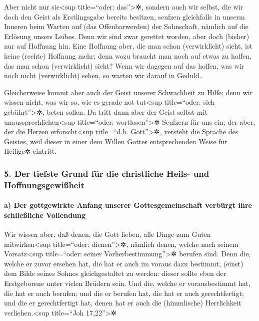  Aber nicht nur sie\textless sup title=``oder:
das''\textgreater✲, sondern auch wir selbst, die wir doch den Geist als
Erstlingsgabe bereits besitzen, seufzen gleichfalls in unserm Inneren
beim Warten auf (das Offenbarwerden) der Sohnschaft, nämlich auf die
Erlösung unsers Leibes.  Denn wir sind zwar gerettet
worden, aber doch (bisher) nur auf Hoffnung hin. Eine Hoffnung aber, die
man schon (verwirklicht) sieht, ist keine (rechte) Hoffnung mehr; denn
wozu braucht man noch auf etwas zu hoffen, das man schon (verwirklicht)
sieht?  Wenn wir dagegen auf das hoffen, was wir noch
nicht (verwirklicht) sehen, so warten wir darauf in Geduld.

 Gleicherweise kommt aber auch der Geist unserer
Schwachheit zu Hilfe; denn wir wissen nicht, was wir so, wie es gerade
not tut\textless sup title=``oder: sich gebührt''\textgreater✲, beten
sollen. Da tritt dann aber der Geist selbst mit
unaussprechlichen\textless sup title=``oder: wortlosen''\textgreater✲
Seufzern für uns ein;  der aber, der die Herzen
erforscht\textless sup title=``d.h. Gott''\textgreater✲, versteht die
Sprache des Geistes, weil dieser in einer dem Willen Gottes
entsprechenden Weise für Heilige✲ eintritt.

\hypertarget{der-tiefste-grund-fuxfcr-die-christliche-heils--und-hoffnungsgewiuxdfheit}{%
\subsubsection{5. Der tiefste Grund für die christliche Heils- und
Hoffnungsgewißheit}\label{der-tiefste-grund-fuxfcr-die-christliche-heils--und-hoffnungsgewiuxdfheit}}

\hypertarget{a-der-gottgewirkte-anfang-unserer-gottesgemeinschaft-verbuxfcrgt-ihre-schlieuxdfliche-vollendung}{%
\paragraph{a) Der gottgewirkte Anfang unserer Gottesgemeinschaft
verbürgt ihre schließliche
Vollendung}\label{a-der-gottgewirkte-anfang-unserer-gottesgemeinschaft-verbuxfcrgt-ihre-schlieuxdfliche-vollendung}}

 Wir wissen aber, daß denen, die Gott lieben, alle Dinge
zum Guten mitwirken\textless sup title=``oder: dienen''\textgreater✲,
nämlich denen, welche nach seinem Vorsatz\textless sup title=``oder:
seiner Vorherbestimmung''\textgreater✲ berufen sind. 
Denn die, welche er zuvor ersehen hat, die hat er auch im voraus dazu
bestimmt, (einst) dem Bilde seines Sohnes gleichgestaltet zu werden:
dieser sollte eben der Erstgeborene unter vielen Brüdern sein.
 Und die, welche er vorausbestimmt hat, die hat er auch
berufen; und die er berufen hat, die hat er auch gerechtfertigt; und die
er gerechtfertigt hat, denen hat er auch die (himmlische) Herrlichkeit
verliehen.\textless sup title=``Joh 17,22''\textgreater✲


